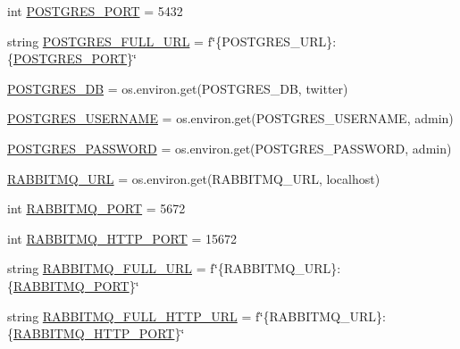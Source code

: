 \begin{DoxyCompactItemize}
\item 
int \hyperlink{namespacetwitter_1_1credentials_a3253c5f019c9da8f13ca42822a655fb9}{P\+O\+S\+T\+G\+R\+E\+S\+\_\+\+P\+O\+RT} = 5432
\item 
string \hyperlink{namespacetwitter_1_1credentials_a7c6d62d13cb6e8f054907f09ac0e483d}{P\+O\+S\+T\+G\+R\+E\+S\+\_\+\+F\+U\+L\+L\+\_\+\+U\+RL} = f\char`\"{}\{P\+O\+S\+T\+G\+R\+E\+S\+\_\+\+U\+RL\}\+:\{\hyperlink{namespacetwitter_1_1credentials_a3253c5f019c9da8f13ca42822a655fb9}{P\+O\+S\+T\+G\+R\+E\+S\+\_\+\+P\+O\+RT}\}\char`\"{}
\item 
\hyperlink{namespacetwitter_1_1credentials_a763f0dc10d8ee0651be685f541d32df7}{P\+O\+S\+T\+G\+R\+E\+S\+\_\+\+DB} = os.\+environ.\+get(\textquotesingle{}P\+O\+S\+T\+G\+R\+E\+S\+\_\+\+DB\textquotesingle{}, \textquotesingle{}twitter\textquotesingle{})
\item 
\hyperlink{namespacetwitter_1_1credentials_a6977298da4f5fec9f31735b844107535}{P\+O\+S\+T\+G\+R\+E\+S\+\_\+\+U\+S\+E\+R\+N\+A\+ME} = os.\+environ.\+get(\textquotesingle{}P\+O\+S\+T\+G\+R\+E\+S\+\_\+\+U\+S\+E\+R\+N\+A\+ME\textquotesingle{}, \textquotesingle{}admin\textquotesingle{})
\item 
\hyperlink{namespacetwitter_1_1credentials_a1cbc885ce051593b978556ae0ebd2b17}{P\+O\+S\+T\+G\+R\+E\+S\+\_\+\+P\+A\+S\+S\+W\+O\+RD} = os.\+environ.\+get(\textquotesingle{}P\+O\+S\+T\+G\+R\+E\+S\+\_\+\+P\+A\+S\+S\+W\+O\+RD\textquotesingle{}, \textquotesingle{}admin\textquotesingle{})
\item 
\hyperlink{namespacetwitter_1_1credentials_aeb6343a68429ca746917e229b05e1331}{R\+A\+B\+B\+I\+T\+M\+Q\+\_\+\+U\+RL} = os.\+environ.\+get(\textquotesingle{}R\+A\+B\+B\+I\+T\+M\+Q\+\_\+\+U\+RL\textquotesingle{}, \textquotesingle{}localhost\textquotesingle{})
\item 
int \hyperlink{namespacetwitter_1_1credentials_a73d9bf848d384c9b1c365d338001e630}{R\+A\+B\+B\+I\+T\+M\+Q\+\_\+\+P\+O\+RT} = 5672
\item 
int \hyperlink{namespacetwitter_1_1credentials_a76160bd3109ecfc3ecb2cacae1bcb030}{R\+A\+B\+B\+I\+T\+M\+Q\+\_\+\+H\+T\+T\+P\+\_\+\+P\+O\+RT} = 15672
\item 
string \hyperlink{namespacetwitter_1_1credentials_acd4bd8db011d2e515253cec45beafbab}{R\+A\+B\+B\+I\+T\+M\+Q\+\_\+\+F\+U\+L\+L\+\_\+\+U\+RL} = f\char`\"{}\{R\+A\+B\+B\+I\+T\+M\+Q\+\_\+\+U\+RL\}\+:\{\hyperlink{namespacetwitter_1_1credentials_a73d9bf848d384c9b1c365d338001e630}{R\+A\+B\+B\+I\+T\+M\+Q\+\_\+\+P\+O\+RT}\}\char`\"{}
\item 
string \hyperlink{namespacetwitter_1_1credentials_a83bbf45b8441a0d30793390f1c4ef934}{R\+A\+B\+B\+I\+T\+M\+Q\+\_\+\+F\+U\+L\+L\+\_\+\+H\+T\+T\+P\+\_\+\+U\+RL} = f\char`\"{}\{R\+A\+B\+B\+I\+T\+M\+Q\+\_\+\+U\+RL\}\+:\{\hyperlink{namespacetwitter_1_1credentials_a76160bd3109ecfc3ecb2cacae1bcb030}{R\+A\+B\+B\+I\+T\+M\+Q\+\_\+\+H\+T\+T\+P\+\_\+\+P\+O\+RT}\}\char`\"{}

\end{DoxyCompactItemize}

